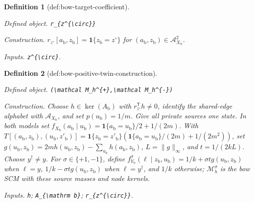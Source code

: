 \documentclass{article}
\newtheorem{definition}{Definition}
\begin{document}
\begin{definition}[def:bow-target-coefficient]\label{def:bow-target-coefficient}
\par\smallskip\noindent\emph{Defined object.} \texttt{r\_\allowbreak{}\{z\textasciicircum{}\{\textbackslash{}\allowbreak{}circ\}\allowbreak{}\}\allowbreak{}}
\par\smallskip\noindent\emph{Construction.} \(r_{z^{\circ}}[a_{\mathrm b},z_{\mathrm b}]=\mathbf 1\{z_{\mathrm b}=z^{\circ}\}\) for \((a_{\mathrm b},z_{\mathrm b})\in\mathcal A_{X_{\mathrm b}}^2\).
\par\smallskip\noindent\emph{Inputs.} \texttt{z\textasciicircum{}\{\textbackslash{}\allowbreak{}circ\}\allowbreak{}}.
\end{definition}

\begin{definition}[def:bow-positive-twin-construction]\label{def:bow-positive-twin-construction}
\par\smallskip\noindent\emph{Defined object.} \texttt{(\textbackslash{}\allowbreak{}mathcal M\_\allowbreak{}h\textasciicircum{}\{+\allowbreak{}\}\allowbreak{},\allowbreak{}\textbackslash{}\allowbreak{}mathcal M\_\allowbreak{}h\textasciicircum{}\{-\allowbreak{}\}\allowbreak{})}
\par\smallskip\noindent\emph{Construction.} Choose \(h\in\ker(A_{\mathrm b})\) with \(r_{z^{\circ}}^{\mathsf T}h\ne0\), identify the shared-edge alphabet with \(\mathcal A_{X_{\mathrm b}}\), and set \(p(u_{\mathrm b})=1/m\). Give all private sources one state. In both models set \(f_{X_{\mathrm b}}(a_{\mathrm b}\mid u_{\mathrm b})=\mathbf 1\{a_{\mathrm b}=u_{\mathrm b}\}/2+1/(2m)\). With \(T[(a_{\mathrm b},z_{\mathrm b}),(u_{\mathrm b},z'_{\mathrm b})]=\mathbf 1\{z_{\mathrm b}=z'_{\mathrm b}\}(\mathbf 1\{a_{\mathrm b}=u_{\mathrm b}\}/(2m)+1/(2m^2))\), set \(g(u_{\mathrm b},z_{\mathrm b})=2m h(u_{\mathrm b},z_{\mathrm b})-\sum_{a_{\mathrm b}}h(a_{\mathrm b},z_{\mathrm b})\), \(L=\lVert g\rVert_{\infty}\), and \(t=1/(2kL)\). Choose \(y^{\dagger}\ne y\). For \(\sigma\in\{+1,-1\}\), define \(f^{\sigma}_{Y_{\mathrm b}}(\ell\mid z_{\mathrm b},u_{\mathrm b})=1/k+\sigma t g(u_{\mathrm b},z_{\mathrm b})\) when \(\ell=y\), \(1/k-\sigma t g(u_{\mathrm b},z_{\mathrm b})\) when \(\ell=y^{\dagger}\), and \(1/k\) otherwise; \(\mathcal M_h^{\sigma}\) is the bow SCM with these source masses and node kernels.
\par\smallskip\noindent\emph{Inputs.} \texttt{h}; \texttt{A\_\allowbreak{}\{\textbackslash{}\allowbreak{}mathrm b\}\allowbreak{}}; \texttt{r\_\allowbreak{}\{z\textasciicircum{}\{\textbackslash{}\allowbreak{}circ\}\allowbreak{}\}\allowbreak{}}.
\end{definition}
\end{document}
